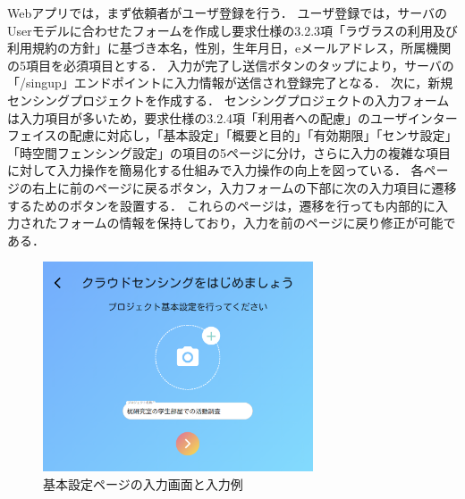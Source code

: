 Webアプリでは，まず依頼者がユーザ登録を行う．
ユーザ登録では，サーバのUserモデルに合わせたフォームを作成し要求仕様の3.2.3項「ラヴラスの利用及び利用規約の方針」に基づき本名，性別，生年月日，eメールアドレス，所属機関の5項目を必須項目とする．
入力が完了し送信ボタンのタップにより，サーバの「/singup」エンドポイントに入力情報が送信され登録完了となる．
次に，新規センシングプロジェクトを作成する．
センシングプロジェクトの入力フォームは入力項目が多いため，要求仕様の3.2.4項「利用者への配慮」のユーザインターフェイスの配慮に対応し，「基本設定」「概要と目的」「有効期限」「センサ設定」「時空間フェンシング設定」の項目の5ページに分け，さらに入力の複雑な項目に対して入力操作を簡易化する仕組みで入力操作の向上を図っている．
各ページの右上に前のページに戻るボタン，入力フォームの下部に次の入力項目に遷移するためのボタンを設置する．
これらのページは，遷移を行っても内部的に入力されたフォームの情報を保持しており，入力を前のページに戻り修正が可能である．
\begin{figure}[H]
  \centering
  \includegraphics[width=80mm]{baseSetting.png}
  \caption{基本設定ページの入力画面と入力例}
  \label{baseSetting}
\end{figure}

